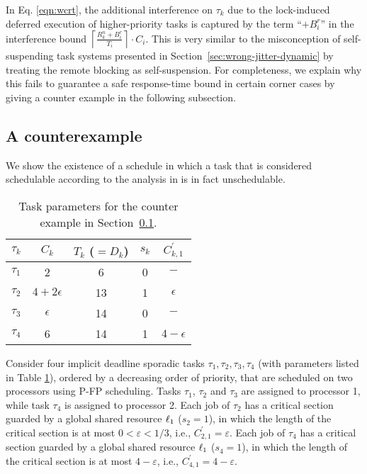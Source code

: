 In Eq. \eqref{eqn:wcrt}, the additional interference on $\tau_k$ due to the lock-induced deferred execution of higher-priority tasks is captured by the term ``$+ B^r_i$'' in the interference bound  $\left \lceil \frac{R_k^n + B_i^r}{T_i} \right \rceil \cdot C_i$. This is very similar to the misconception of self-suspending task systems presented in Section~\ref{sec:wrong-jitter-dynamic} by treating the remote blocking as self-suspension. For completeness, we explain why this fails to guarantee a safe response-time bound in certain corner cases by giving a counter example in the following subsection.

\subsection{A counterexample}
\label{sec:counterexample}

We show the existence of a schedule in which a task that is considered schedulable according to the analysis in \cite{lakshmanan-2009} is in fact unschedulable.

%

\begin{table}
\centering
    \begin{tabular}{|c|c|c|c|c|} 
 \hline
        $\tau_k$ & $C_k$ & $T_k$ ($= D_k$) & $s_k$ & $C_{k,1}^{\prime}$\\
        \hline
        $\tau_1$ & 2             & 6  & 0 & $-$\\ 
        $\tau_2$ & $4+2\epsilon$ & 13 & 1 & $\epsilon$\\
        $\tau_3$ & $\epsilon$    & 14 & 0 & $-$\\
        $\tau_4$ & 6             & 14 & 1 & $4-\epsilon$\\ 
        \hline
    \end{tabular}
    \caption{Task parameters for the counter example in Section~\ref{sec:counterexample}.}
    \label{table:parameters}
\end{table}

Consider four implicit deadline sporadic tasks ${\tau_1, \tau_2, \tau_3, \tau_4}$ (with parameters listed in Table \ref{table:parameters}), ordered by a decreasing order of priority, that are scheduled on two processors using P-FP scheduling. Tasks $\tau_1$, $\tau_2$ and $\tau_3$ are assigned to processor 1, while task $\tau_4$ is assigned to processor 2. Each job of $\tau_2$ has a critical section guarded by a global shared resource $\ell_1$  ($s_2 = 1$), in which the length of the critical section is at most $0 < \varepsilon < 1/3$, i.e., $C_{2,1}^{\prime} = \varepsilon$. 
Each job of $\tau_4$ has a critical section guarded by a global shared resource $\ell_1$  ($s_4 = 1$), in which the length of the critical section is at most $4-\varepsilon$, i.e., $C_{4,1}^{\prime} = 4-\varepsilon$. 

